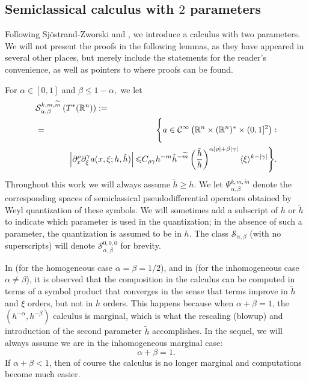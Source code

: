 \documentclass[twoside, final]{amsart}
\theoremstyle{definition}
\numberwithin{equation}{section}
\begin{document}
\subsection{Semiclassical calculus with $2$ parameters}

Following Sj\"ostrand-Zworski \cite[\S3.3]{SjZw-frac} and \cite{ChWu-lsm}, we introduce a
calculus with two parameters.  We will not present the proofs in the
following lemmas, as they have appeared in several other places, but
merely include the statements for the reader's convenience, as well as
pointers to where proofs can be found.

For $\alpha\in [0,1]$ and $\beta{\leqslant} 1-\alpha,$ we let
\begin{eqnarray*}
\lefteqn{{{\mathcal S}}_{\alpha,\beta}^{k,m, \widetilde{m}} \left(T^*({\mathbb{R}}^n) \right):= } \\
& = & \Bigg\{ a \in {{\mathcal C}^\infty} \left({\mathbb{R}}^n \times ({\mathbb{R}}^n)^* \times (0,1]^2 \right):  \\
 && \quad \quad  \left| \partial_x^\rho \partial_\xi^\gamma a(x, \xi; h, \tilde{h}) \right| 
{\leqslant} C_{\rho \gamma}h^{-m}\tilde{h}^{-\widetilde{m}} \left(
  \frac{\tilde{h}}{h} \right)^{\alpha |\rho| + \beta |\gamma|} 
\langle \xi \rangle^{k - |\gamma|} \Bigg\}.
\end{eqnarray*}
Throughout this work we will always assume $\tilde{h} {\geqslant} h$.  
We let $\Psi_{\alpha,\beta}^{k, m, \widetilde{m}}$ denote the
corresponding spaces of semiclassical pseudodifferential operators
obtained by Weyl quantization of these symbols. We will sometimes add a
subscript of $h$ or $\tilde{h}$ to indicate which parameter is used in
the quantization; in the absence of such a parameter, the quantization
is assumed to be in $h.$  The class ${{\mathcal S}}_{\alpha,\beta}$ (with no
superscripts) will denote ${{\mathcal S}}_{\alpha,\beta}^{0,0,0}$ for brevity.

In \cite{SjZw-frac} (for the homogeneous case $\alpha=\beta=1/2$), and
in \cite{ChWu-lsm} (for the inhomogeneous case $\alpha \neq \beta$), 
it is observed that the composition in the
calculus can be computed in terms of a symbol product that converges
in the sense that terms improve in $\tilde{h}$ and $\xi$ orders, but
not in $h$ orders.
This happens because when $\alpha + \beta = 1$, the $(h^{-\alpha},
h^{-\beta})$ calculus is marginal, which is what the rescaling (blowup) and
introduction of the second parameter $\tilde{h}$ accomplishes.  
In the sequel, we will always assume we are in the inhomogeneous
marginal case:
$$
\alpha+\beta=1.
$$
If $\alpha + \beta <1$, then of course the calculus is no longer
marginal and computations become much easier.
\end{document}
